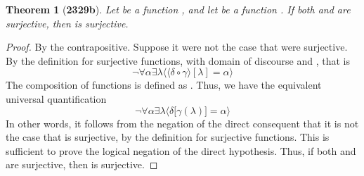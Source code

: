 \documentclass[preview]{standalone}
\newtheorem*{theorem*}{Theorem}
\begin{document}
\begin{theorem*}[\textbf{2329b}]
    Let \bm{$\delta$} be a function 
    , 
    and let \bm{$\gamma$} be a function 
    \bm{$\gamma : \Lambda \rightarrow \Delta$}. 
    If both \bm{$\delta$} and \bm{$\gamma$} are surjective, 
    then 
    \bm{$\big \langle \delta \circ \gamma \big \rangle$} 
    is surjective.
\end{theorem*}

\begin{proof}
    By the contrapositive. 
    Suppose it were not the case that
    \bm{$\big \langle \delta \circ \gamma \big \rangle$} 
    were surjective. 
    By the definition for surjective functions,
    with domain of discourse \bm{$\lambda \in \Lambda$} 
    and , 
    that is
    \begin{equation*}
        \lnot \forall \alpha \exists \lambda \Big \langle
            \big \langle \delta \circ \gamma \big \rangle [\lambda] 
                = 
            \alpha
        \Big \rangle
    \end{equation*}
    The composition of functions 
    \bm{$\big \langle \delta \circ \gamma \big \rangle [\lambda]$} 
    is defined as \bm{$\delta \big[ \gamma(\lambda) \big]$}.
    Thus, we have the equivalent universal quantification
    \begin{equation*}
        \lnot \forall \alpha \exists \lambda \Big \langle
            \delta \big[ \gamma (\lambda) \big] = \alpha \Big \rangle
    \end{equation*}
    In other words, it follows from the negation of the direct consequent 
    that it is not the case that \bm{$\delta$} is surjective, 
    by the definition for surjective functions.
    This is sufficient to prove the logical negation of the direct hypothesis.
    Thus, if both \bm{$\delta$} and \bm{$\gamma$} are surjective, 
    then \bm{$\big \langle \delta \circ \gamma \big \rangle$} is surjective.
\color{lightgray} \end{proof}
\end{document}
